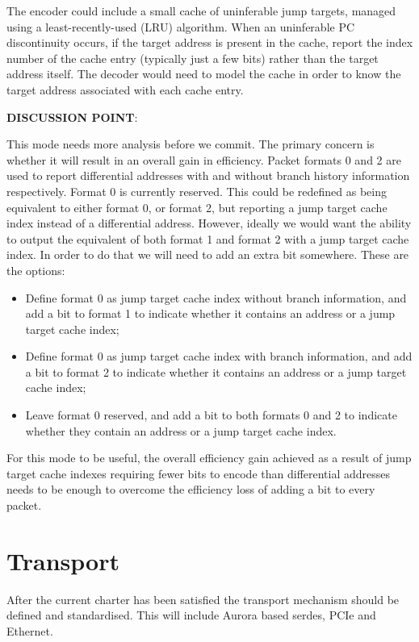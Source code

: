 The encoder could include a small cache of uninferable jump targets, managed using a
least-recently-used (LRU) algorithm.  When an uninferable PC discontinuity occurs, if 
the target address is present in the cache, report the index number of the cache
entry (typically just a few bits) rather than the target address itself.  The decoder 
would need to model the cache in order to know the target address associated with
each cache entry.

\textbf{DISCUSSION POINT}:

This mode needs more analysis before we commit.  The primary concern is whether it will 
result in an overall gain in efficiency.  Packet formats 0 and 2 are used to report 
differential addresses with and without branch history information respectively.  Format
0 is currently reserved.  This could be redefined as being equivalent to either format 0, or 
format 2, but reporting a jump target cache index instead of a differential address.
However, ideally we would want the ability to output the equivalent of both format 1 and
format 2 with a jump target cache index.  In order to do that we will need to add an extra bit
somewhere.  These are the options:

\begin{itemize}
  \item Define format 0 as jump target cache index without branch information, and add a bit to
    format 1 to indicate whether it contains an address or a jump target cache index;
  \item Define format 0 as jump target cache index with branch information, and add a bit to
    format 2 to indicate whether it contains an address or a jump target cache index;
  \item Leave format 0 reserved, and add a bit to both formats 0 and 2 to indicate whether
    they contain an address or a jump target cache index.
\end{itemize}

For this mode to be useful, the overall efficiency gain achieved as a result of jump target cache indexes
requiring fewer bits to encode than differential addresses needs to be enough to overcome the efficiency
loss of adding a bit to every packet. 

\section{Transport}

After the current charter has been satisfied the transport mechanism
should be defined and standardised. This will include Aurora based
serdes, PCIe and Ethernet.
